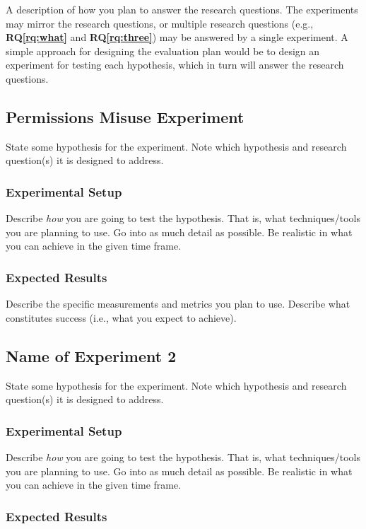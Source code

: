 \documentclass[10pt,twocolumn,pdftex]{article}
\newcommand{\rqref}[1]{\textbf{RQ\ref{#1}}}
\begin{document}
A description of how you plan to answer the research questions. The
experiments  may mirror the research questions, or multiple research
questions (e.g., \rqref{rq:what} and \rqref{rq:three}) may be answered
by a single experiment. A simple approach for designing the evaluation
plan would be to design an experiment for testing each hypothesis, which
in turn will answer the research questions.

\subsection{Permissions Misuse Experiment}


State some hypothesis for the experiment. Note which hypothesis and
research question(s) it is designed to address.

\subsubsection{Experimental Setup}
Describe {\em how} you are going to test the hypothesis. That is, what
techniques/tools you are planning to use. Go into as much detail as
possible. Be realistic in what you can achieve in the given time frame.

\subsubsection{Expected Results}

Describe the specific measurements and metrics you plan to use. Describe
what constitutes success (i.e., what you expect to achieve).

\subsection{Name of Experiment 2}

State some hypothesis for the experiment. Note which hypothesis and
research question(s) it is designed to address.

\subsubsection{Experimental Setup}
Describe {\em how} you are going to test the hypothesis. That is, what
techniques/tools you are planning to use. Go into as much detail as
possible. Be realistic in what you can achieve in the given time frame.

\subsubsection{Expected Results}
\end{document}
